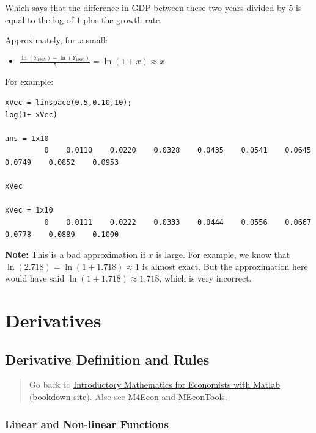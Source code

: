 \documentclass[
]{book}
\providecommand{\tightlist}{%
  \setlength{\itemsep}{0pt}\setlength{\parskip}{0pt}}
\begin{document}
Which says that the difference in GDP between these two years divided by
5 is equal to the log of \(1\) plus the growth rate.

Approximately, for \(x\) small:

\begin{itemize}
\tightlist
\item
  \(\displaystyle \frac{\ln (Y_{1995} )-\ln (Y_{1990} )}{5}=\ln (1+x)\approx x\)
\end{itemize}

For example:

\begin{verbatim}
xVec = linspace(0.5,0.10,10);
log(1+ xVec)

ans = 1x10    
         0    0.0110    0.0220    0.0328    0.0435    0.0541    0.0645    0.0749    0.0852    0.0953

xVec

xVec = 1x10    
         0    0.0111    0.0222    0.0333    0.0444    0.0556    0.0667    0.0778    0.0889    0.1000
\end{verbatim}

\textbf{Note:} This is a bad approximation if \(x\) is large. For example, we
know that \(\ln (2.718)=\ln (1+1.718)\approx 1\) is almost exact. But the
approximation here would have said \(\ln (1+1.718)\approx 1.718\), which
is very incorrect.

\hypertarget{derivatives}{%
\chapter{Derivatives}\label{derivatives}}

\hypertarget{derivative-definition-and-rules}{%
\section{Derivative Definition and Rules}\label{derivative-definition-and-rules}}

\begin{quote}
Go back to \href{https://math4econ.github.io/}{Introductory Mathematics for Economists with Matlab} (\href{https://math4econ.github.io/bookdown}{bookdown site}). Also see \href{http://fanwangecon.github.io/M4Econ}{M4Econ} and \href{https://fanwangecon.github.io/MEconTools/}{MEconTools}.
\end{quote}

\hypertarget{linear-and-non-linear-functions}{%
\subsection{Linear and Non-linear Functions}\label{linear-and-non-linear-functions}}
\end{document}
